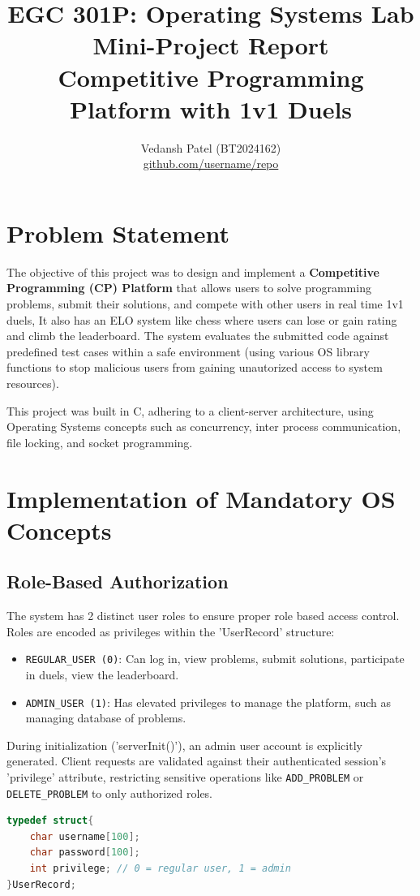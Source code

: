 \documentclass[12pt,a4paper]{article}
\title{
    \vspace{-2cm}
    \textbf{EGC 301P: Operating Systems Lab} \\
    \large Mini-Project Report \\
    \vspace{0.5cm}
    \textbf{Competitive Programming Platform with 1v1 Duels}
}
\author{Vedansh Patel (BT2024162) \\ \href{https://github.com/username/repo}{github.com/username/repo}}
\date{}
\begin{document}
\maketitle

\section{Problem Statement}
The objective of this project was to design and implement a \textbf{Competitive Programming (CP) Platform} that allows users to solve programming problems, submit their solutions, and compete with other users in real time 1v1 duels, It also has an ELO system like chess where users can lose or gain rating and climb the leaderboard. The system evaluates the submitted code against predefined test cases within a safe environment (using various OS library functions to stop malicious users from gaining unautorized access to system resources).

This project was built in C, adhering to a client-server architecture, using Operating Systems concepts such as concurrency, inter process communication, file locking, and socket programming.

\section{Implementation of Mandatory OS Concepts}

\subsection{Role-Based Authorization}
The system has 2 distinct user roles to ensure proper role based access control. Roles are encoded as privileges within the 'UserRecord' structure:
\begin{itemize}
    \item \texttt{REGULAR\_USER (0)}: Can log in, view problems, submit solutions, participate in duels, view the leaderboard.
    \item \texttt{ADMIN\_USER (1)}: Has elevated privileges to manage the platform, such as managing database of problems.
\end{itemize}
During initialization ('serverInit()'), an admin user account is explicitly generated. Client requests are validated against their authenticated session's 'privilege' attribute, restricting sensitive operations like \texttt{ADD\_PROBLEM} or \texttt{DELETE\_PROBLEM} to only authorized roles.

\begin{lstlisting}[language=C, caption=UserRecord Structure for Authorization]
typedef struct{
    char username[100];
    char password[100];
    int privilege; // 0 = regular user, 1 = admin
}UserRecord;
\end{lstlisting}
\end{document}
